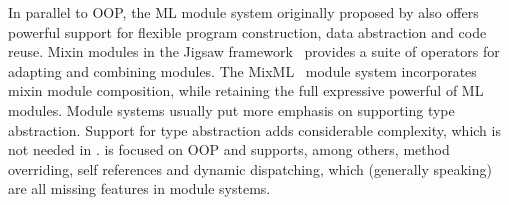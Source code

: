 In parallel to OOP, the ML module system originally proposed by
\citet{MacQueen_1984} also offers powerful support for flexible program
construction, data abstraction and code reuse. Mixin modules in the Jigsaw
framework~\citep{Bracha92modularitymeets} provides a suite of operators for
adapting and combining modules. The MixML~\citep{Rossberg_2013} module system
incorporates mixin module composition, while retaining the full expressive
powerful of ML modules. Module systems usually put more emphasis on supporting
type abstraction. Support for type abstraction adds considerable complexity,
which is not needed in \sedel. \sedel is focused on OOP and supports, among
others, method overriding, self references and dynamic dispatching, which
(generally speaking) are all missing features in module systems.




